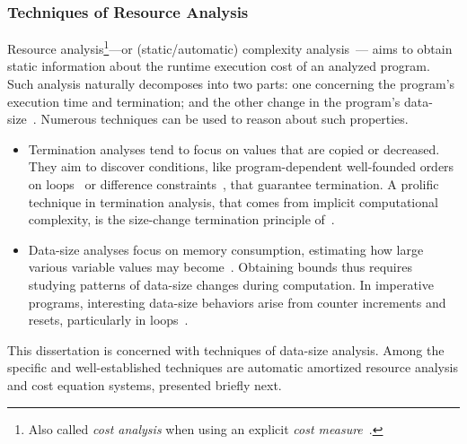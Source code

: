 \subsubsection{Techniques of Resource Analysis}\label{resource-analysis}

Resource analysis\footnote{
Also called \emph{cost analysis} when using an explicit \emph{cost measure}~\cite{albert2008}.
}---or (static/automatic) {complexity analysis}~\cite{rosendahl1989,leivant2013}---%
aims to obtain static information about the runtime {execution cost} of an analyzed program.
Such analysis naturally decomposes into two parts: one concerning the program's execution time and termination;
and the other change in the program's data-size~\cite{jones2009}.
Numerous techniques can be used to reason about such properties.

\begin{itemize}
\item Termination analyses tend to focus on values that are copied or decreased.
      They aim to discover conditions, like program-dependent well-founded orders on loops~\cite{lee2001} or difference constraints~\cite{sinn2017},
      that guarantee termination.
      A prolific technique in termination analysis, that comes from implicit computational complexity, is the size-change termination principle of~\textcite{lee2001}.
\item Data-size analyses focus on memory consumption, estimating how large various variable values may become~\cite{lommen2023}.
      Obtaining bounds thus requires studying patterns of data-size changes during computation.
      In imperative programs, interesting data-size behaviors arise from counter increments and resets, particularly in loops~\cite{sinn2017,benamram2020}.
\end{itemize}

This dissertation is concerned with techniques of data-size analysis.
Among the specific and well-established techniques are automatic amortized resource analysis and cost equation systems, presented briefly next.

